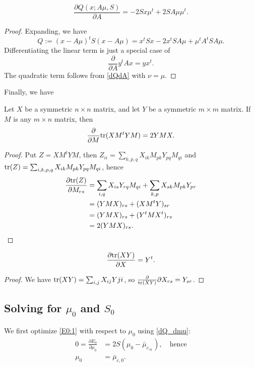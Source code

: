 \documentclass[12pt,leqno]{article}
\begin{document}
\begin{Cor}\label{dM}
  $$
  \frac{\partial{Q(x;A\mu,S)}}{\partial{A}} = -2Sx\mu^t + 2SA\mu\mu^t.
  $$
\end{Cor}
\begin{proof}
Expanding, we have
$$
Q := (x-A\mu)^tS(x-A\mu) = x^tSx - 2x^tSA\mu + \mu^tA^tSA\mu.
$$
Differentiating the linear term is just a special case of
$$
 \frac{\partial}{\partial{A}}y^tAx = yx^t.
$$
The quadratic term follows from \eqref{dQdA} with $\nu = \mu$.
\end{proof}
Finally, we have
\begin{Lem} \label{d_tr_prod} Let $X$ be a symmetric $n\times{n}$ matrix, and let $Y$ be a symmetric $m\times{m}$
  matrix. If $M$ is any $m\times{n}$ matrix, then
  $$
  \frac{\partial}{\partial{M}}\text{\rm tr}(XM^tYM) = 2YMX.
  $$
\end{Lem}
\begin{proof}
  Put $Z = XM^tYM$, then $Z_{ii} = \sum_{k,p,q}X_{ik}M_{pk}Y_{pq}M_{qi}$ and
  $\text{\rm tr}(Z) = \sum_{i,k,p,q}X_{ik}M_{pk}Y_{pq}M_{qi}$, hence
  \begin{align*}
    \frac{\partial\text{\rm tr}(Z)}{\partial{M_{rs}}} &= \sum_{i,q}X_{is}Y_{rq}M_{qi} + \sum_{k,p}X_{sk}M_{pk}Y_{pr}\\
    &= (YMX)_{rs} + (XM^tY)_{sr} \\
    &= (YMX)_{rs} + (Y^tMX^t)_{rs} \\
    &= 2(YMX)_{rs}.
  \end{align*}
\end{proof}

\begin{Lem}\label{d_tr_prod:1}
  $$
  \frac{\partial \text{\rm tr}(XY)}{\partial{X}} = Y^t.
  $$
\end{Lem}
  \begin{proof}
    We have $\text{\rm tr}(XY) = \sum_{i,j}X_{ij}Y{ji}$, so $\frac\partial{\text{\rm tr}(XY)}{\partial X_{rs}} = Y_{sr}$.
  \end{proof}
 
\subsection{Solving for  $\mu_0$ and $S_0$}
We first optimize \eqref{E0:1} with respect to $\mu_0$ using \eqref{dQ_dmu}:
\begin{equation} \label{mu_0} 
  \begin{split}
  0 = \frac{\partial{E_0}}{\partial{\mu_0}} &= 2S(\mu_0-\bar{\mu}_{c,_0}),\quad\text{hence}\\
    \mu_0 &= \bar{\mu}_{c,0}.\\
  \end{split}
\end{equation}
\end{document}
